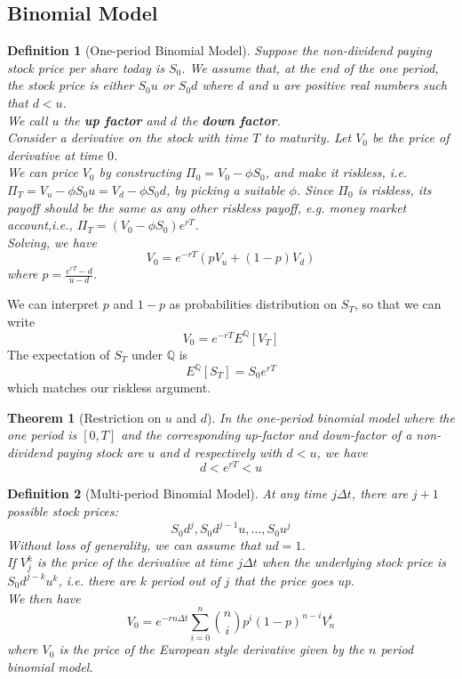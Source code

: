 \documentclass[12pt]{article}
\newtheorem{definition}{Definition}[section]
\newtheorem{theorem}{Theorem}[section]
\theoremstyle{definition}
\begin{document}
\subsection{Binomial Model}
\begin{definition}[One-period Binomial Model]
\normalfont Suppose the non-dividend paying stock price per share today is $S_0$. We assume that, at the end of the one period, the stock price is either $S_0u$ or $S_0d$ where $d$ and $u$ are positive real numbers such that $d<u$.\\
We call $u$ the \textbf{up factor} and $d$ the \textbf{down factor}.\\
Consider a derivative on the stock with time $T$ to maturity. Let $V_0$ be the price of derivative at time $0$.\\
We can price $V_0$ by constructing $\Pi_0=V_0-\phi S_0$, and make it riskless, i.e. $\Pi_T = V_u-\phi S_0u=V_d-\phi S_0d$, by picking a suitable $\phi$. Since $\Pi_0$ is riskless, its payoff should be the same as any other riskless payoff, e.g. money market account,i.e., $\Pi_T = (V_0-\phi S_0)e^{rT}$.\\
Solving, we have
\[
V_0 = e^{-rT}(pV_u+(1-p)V_d)
\]
where $p=\frac{e^{rT}-d}{u-d}$.
\end{definition}
We can interpret $p$ and $1-p$ as probabilities distribution on $S_T$, so that we can write
\[
V_0 = e^{-rT}E^\mathbb{Q}[V_T]
\]
The expectation of $S_T$ under $\mathbb{Q}$ is
\[
E^\mathbb{Q}[S_T] = S_0e^{rT}
\]
which matches our riskless argument.
\begin{theorem}[Restriction on {$u$} and {$d$}]
\normalfont In the one-period binomial model where the one period is $[0,T]$ and the corresponding up-factor and down-factor of a non-dividend paying stock are $u$ and $d$ respectively with $d<u$, we have
\[
d<e^{rT}<u
\]
\end{theorem}
\begin{definition}[Multi-period Binomial Model]
\normalfont At any time $j\Delta t$, there are $j+1$ possible stock prices:
\[
S_0d^j, S_0d^{j-1}u,\ldots, S_0u^j
\]
Without loss of generality, we can assume that $ud=1$.\\
If $V_j^k$ is the price of the derivative at time $j\Delta t$ when the underlying stock price is $S_0d^{j-k}u^k$, i.e. there are $k$ period out of $j$ that the price goes up.\\
We then have
\[
V_0 = e^{-rn\Delta t}\sum_{i=0}^n\binom{n}{i}p^i(1-p)^{n-i}V_n^i
\]
where $V_0$ is the price of the European style derivative given by the $n$ period binomial model.
\end{definition}
\end{document}
